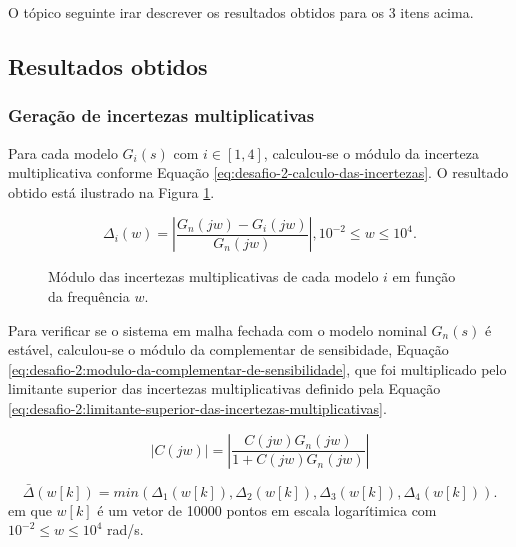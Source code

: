 O tópico seguinte irar descrever os resultados obtidos para os 3 itens acima.

\subsection{Resultados obtidos}
\subsubsection{Geração de incertezas multiplicativas}
Para cada modelo $G_{i}(s)$ com $i \in [1,4]$, calculou-se o módulo da incerteza
multiplicativa conforme Equação \ref{eq:desafio-2-calculo-das-incertezas}. O
resultado obtido está ilustrado na Figura
\ref{fig:desafio-2-resultado-questao-1}.

\begin{equation}
    \label{eq:desafio-2-calculo-das-incertezas}
    \Delta_{i}(w) = \left | \frac{G_{n}(jw) - G_{i}(jw)}{G_{n}(jw)} \right |,
    10^{-2} \leq w \leq 10^{4}.
\end{equation}

\begin{figure}[!ht]
    \caption{Módulo das incertezas multiplicativas de cada modelo $i$ em
    função da frequência $w$.}
    \vspace{-10pt}
    \hspace{-30pt}
    \label{fig:desafio-2-resultado-questao-1}
    \begin{minipage}{\linewidth}
        
    \end{minipage}
\end{figure}

Para verificar se o sistema em malha fechada com o modelo nominal $G_{n}(s)$ é
estável, calculou-se o módulo da complementar de sensibidade, Equação
\ref{eq:desafio-2:modulo-da-complementar-de-sensibilidade}, que foi multiplicado
pelo limitante superior das incertezas multiplicativas definido pela Equação
\ref{eq:desafio-2:limitante-superior-das-incertezas-multiplicativas}.

\begin{equation}
    \label{eq:desafio-2:modulo-da-complementar-de-sensibilidade}
    |\textit{C}(jw)| = \left | \frac{C(jw)G_{n}(jw)}{1 + C(jw)G_{n}(jw)} \right |
\end{equation}

\begin{equation}
    \label{eq:desafio-2:limitante-superior-das-incertezas-multiplicativas}
    \bar{\Delta}(w[k]) = min(\Delta_{1}(w[k]), \Delta_{2}(w[k]), \Delta_{3}(w[k]),
    \Delta_{4}(w[k])). 
\end{equation}
em que $w[k]$ é um vetor de 10000 pontos em escala logarítimica com $10^{-2}
\leq w \leq 10^{4}$ rad/s.

